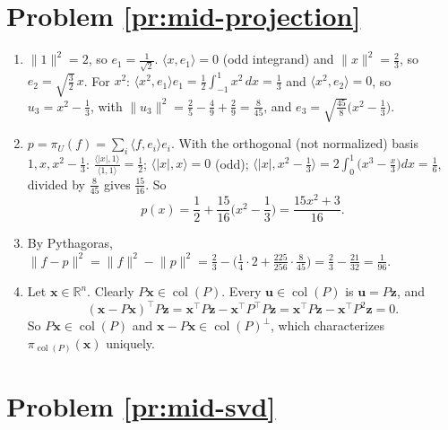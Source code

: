 \documentclass[11pt]{article}
\newcommand{\norm}[1]{\lVert #1 \rVert}
\newcommand{\ip}[2]{\langle #1, #2 \rangle}
\DeclareMathOperator{\col}{col}
\begin{document}
\section*{Problem \ref{pr:mid-projection}}

\begin{enumerate}[label=(\alph*)]
    \item $\norm{1}^2 = 2$, so $e_1 = \frac{1}{\sqrt 2}$. $\ip{x}{e_1} = 0$ (odd integrand) and $\norm{x}^2 = \frac{2}{3}$, so $e_2 = \sqrt{\frac{3}{2}}\,x$. For $x^2$: $\ip{x^2}{e_1}e_1 = \frac{1}{2}\int_{-1}^1 x^2\,dx = \frac{1}{3}$ and $\ip{x^2}{e_2} = 0$, so $u_3 = x^2 - \frac{1}{3}$, with $\norm{u_3}^2 = \frac{2}{5} - \frac{4}{9} + \frac{2}{9} = \frac{8}{45}$, and $e_3 = \sqrt{\frac{45}{8}}\big(x^2 - \frac{1}{3}\big)$.
    \item $p = \pi_U(f) = \sum_i \ip{f}{e_i}e_i$. With the orthogonal (not normalized) basis $1, x, x^2 - \frac{1}{3}$: $\frac{\ip{|x|}{1}}{\ip{1}{1}} = \frac{1}{2}$; $\ip{|x|}{x} = 0$ (odd); $\ip{|x|}{x^2 - \frac{1}{3}} = 2\int_0^1 \big(x^3 - \frac{x}{3}\big)dx = \frac{1}{6}$, divided by $\frac{8}{45}$ gives $\frac{15}{16}$. So
    \[p(x) = \frac{1}{2} + \frac{15}{16}\Big(x^2 - \frac{1}{3}\Big) = \frac{15x^2 + 3}{16}.\]
    \item By Pythagoras, $\norm{f - p}^2 = \norm{f}^2 - \norm{p}^2 = \frac{2}{3} - \Big(\frac{1}{4} \cdot 2 + \frac{225}{256} \cdot \frac{8}{45}\Big) = \frac{2}{3} - \frac{21}{32} = \frac{1}{96}$.
    \item Let $\mathbf{x} \in \mathbb{R}^n$. Clearly $P\mathbf{x} \in \col(P)$. Every $\mathbf{u} \in \col(P)$ is $\mathbf{u} = P\mathbf{z}$, and
    \[(\mathbf{x} - P\mathbf{x})^\top P\mathbf{z} = \mathbf{x}^\top P\mathbf{z} - \mathbf{x}^\top P^\top P\mathbf{z} = \mathbf{x}^\top P\mathbf{z} - \mathbf{x}^\top P^2\mathbf{z} = 0.\]
    So $P\mathbf{x} \in \col(P)$ and $\mathbf{x} - P\mathbf{x} \in \col(P)^\perp$, which characterizes $\pi_{\col(P)}(\mathbf{x})$ uniquely.
\end{enumerate}

\section*{Problem \ref{pr:mid-svd}}
\end{document}

